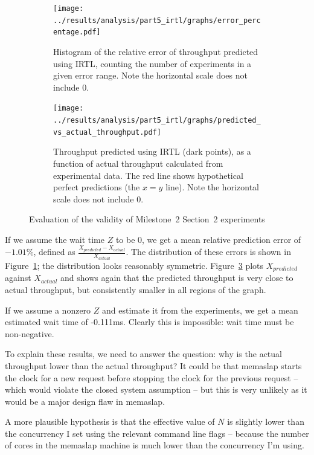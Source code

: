 \documentclass[11pt]{article}
\begin{document}
\begin{figure}[h]
\centering
\begin{subfigure}[t]{0.49\textwidth}
\texttt{[image: ../results/analysis/part5\_irtl/graphs/error\_percentage.pdf]}
\caption{Histogram of the relative error of throughput predicted using IRTL, counting the number of experiments in a given error range. Note the horizontal scale does not include 0.}
\label{fig:part5:error_percentage}
\end{subfigure}
\begin{subfigure}[t]{0.49\textwidth}
\texttt{[image: ../results/analysis/part5\_irtl/graphs/predicted\_vs\_actual\_throughput.pdf]}
\caption{Throughput predicted using IRTL (dark points), as a function of actual throughput calculated from experimental data. The red line shows hypothetical perfect predictions (the $x=y$ line). Note the horizontal scale does not include 0.}
\label{fig:part5:predicted_vs_actual}
\end{subfigure}
\caption{Evaluation of the validity of Milestone~2 Section~2 experiments}
\end{figure}

If we assume the wait time $Z$ to be 0, we get a mean relative prediction error of $-1.01\%$, defined as $\frac{X_{predicted}-X_{actual}}{X_{actual}}$. The distribution of these errors is shown in Figure~\ref{fig:part5:error_percentage}; the distribution looks reasonably symmetric. Figure~\ref{fig:part5:predicted_vs_actual} plots $X_{predicted}$ against $X_{actual}$ and shows again that the predicted throughput is very close to actual throughput, but consistently smaller in all regions of the graph.

If we assume a nonzero $Z$ and estimate it from the experiments, we get a mean estimated wait time of -0.111ms. Clearly this is impossible: wait time must be non-negative.

To explain these results, we need to answer the question: why is the actual throughput lower than the actual throughput? It could be that memaslap starts the clock for a new request before stopping the clock for the previous request -- which would violate the closed system assumption -- but this is very unlikely as it would be a major design flaw in memaslap.

A more plausible hypothesis is that the effective value of $N$ is slightly lower than the concurrency I set using the relevant command line flags -- because the number of cores in the memaslap machine is much lower than the concurrency I'm using.
\end{document}
